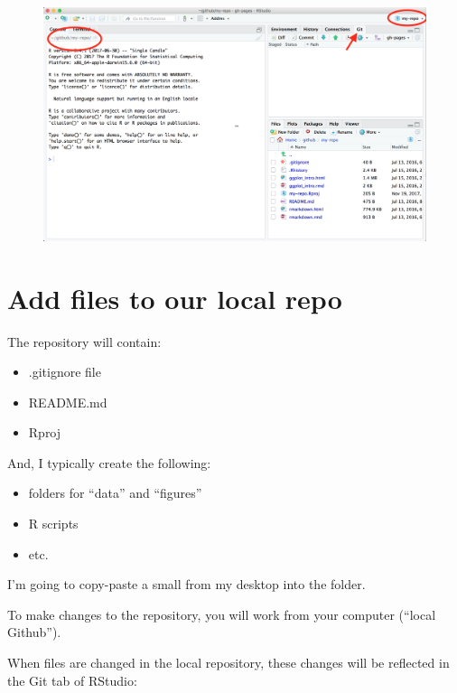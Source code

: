 \documentclass[]{book}
\providecommand{\tightlist}{%
  \setlength{\itemsep}{0pt}\setlength{\parskip}{0pt}}
\theoremstyle{definition}
\theoremstyle{definition}
\theoremstyle{definition}
\theoremstyle{remark}
\begin{document}
\begin{figure}
\centering
\includegraphics{img/RStudio_IDE_git.png}
\caption{}
\end{figure}

\section{Add files to our local repo}\label{add-files-to-our-local-repo}

The repository will contain:

\begin{itemize}
\tightlist
\item
  .gitignore file
\item
  README.md
\item
  Rproj
\end{itemize}

And, I typically create the following:

\begin{itemize}
\tightlist
\item
  folders for ``data'' and ``figures''\\
\item
  R scripts
\item
  etc.
\end{itemize}

I'm going to copy-paste a small from my desktop into the folder.

To make changes to the repository, you will work from your computer
(``local Github'').

When files are changed in the local repository, these changes will be
reflected in the Git tab of RStudio:
\end{document}
